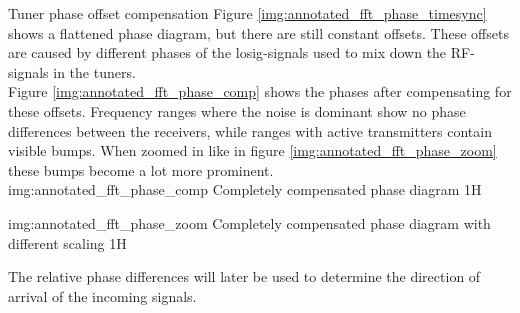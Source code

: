 \begin{subchapter}{Tuner phase offset compensation}
  Figure \ref{img:annotated_fft_phase_timesync} shows a flattened
  phase diagram, but there are still constant offsets.
  These offsets are caused by different phases of the
  \acrshort{losig}-signals used to
  mix down the RF-signals in the tuners. \\

  Figure \ref{img:annotated_fft_phase_comp} shows the phases
  after compensating for these offsets. Frequency ranges where
  the noise is dominant show no phase differences between
  the receivers, while ranges with active transmitters contain
  visible bumps. When zoomed in like in figure \ref{img:annotated_fft_phase_zoom}
  these bumps become a lot more prominent. \\

               {img:annotated_fft_phase_comp}
               {Completely compensated phase diagram}
               {1}{H}

               {img:annotated_fft_phase_zoom}
               {Completely compensated phase diagram with different scaling}
               {1}{H}


  The relative phase differences will later be used to
  determine the direction of arrival of the incoming signals.
\end{subchapter}
